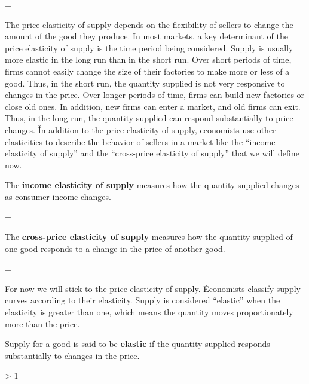 \bse
{} = 
{}
\ese
\ed

The price elasticity of supply depends on the flexibility of sellers to change the amount of the good they produce.
In most markets, a key determinant of the price elasticity of supply is the time period being considered. Supply is
usually more elastic in the long run than in the short run. Over short periods of time, firms cannot easily change
the size of their factories to make more or less of a good. Thus, in the short run, the quantity supplied is not very
responsive to changes in the price. Over longer periods of time, firms can build new factories or close old ones. In
addition, new firms can enter a market, and old firms can exit. Thus, in the long run, the quantity supplied can
respond substantially to price changes. \v

In addition to the price elasticity of supply, economists use other elasticities to describe the behavior of sellers
in a market like the ``income elasticity of supply'' and the ``cross-price elasticity of supply'' that we will define
now.

The \textbf{income elasticity of supply} measures how the quantity supplied changes as consumer income changes.

\bse
{} = 
{}
\ese
\ed

The \textbf{cross-price elasticity of supply} measures how the quantity supplied of one good responds to a change in the
price of another good.

\bse
{} = 
{}
\ese
\ed

For now we will stick to the price elasticity of supply. \v

Economists classify supply curves according to their elasticity. Supply is considered ``elastic'' when the elasticity
is greater than one, which means the quantity moves proportionately more than the price.

Supply for a good is said to be \textbf{elastic} if the quantity supplied responds substantially to changes in the price.

\bse
{} > 1
\ese
\ed

